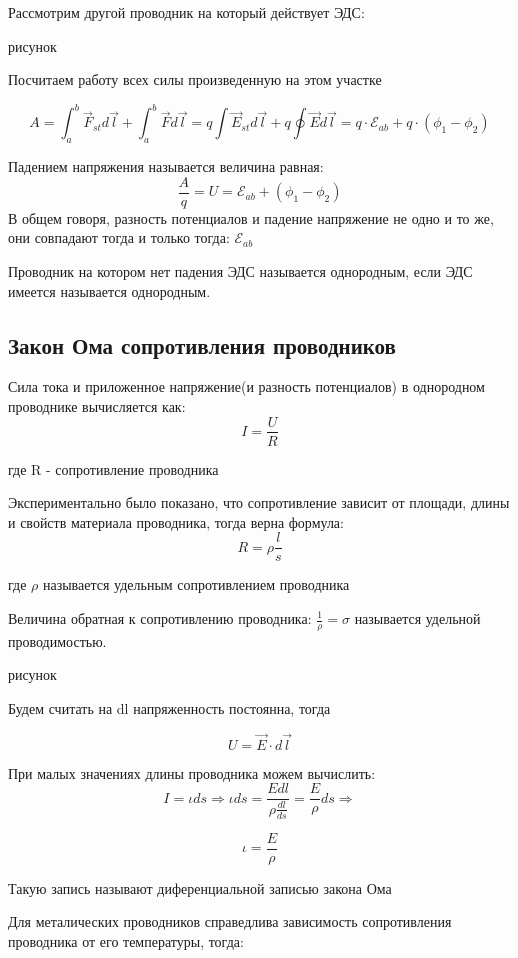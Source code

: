 \documentclass[../main.tex]{subfiles}
\begin{document}
Рассмотрим другой проводник на который действует ЭДС:

рисунок

Посчитаем работу всех силы произведенную на этом участке

\[A = \int_{a}^{b} \vec F_{st} d \vec l + \int_{a}^{b} \vec F d \vec l = q \int \vec E_{st} d \vec l + q \oint \vec E d \vec l = q \cdot \mathscr{E}_{ab} + q \cdot (\phi_1 - \phi_2)\]

 Падением напряжения называется величина равная:
\[\frac{A}{q} = U = \mathscr{E}_{ab} + (\phi_1 - \phi_2)\]
В общем говоря, разность потенциалов и падение напряжение не одно и то же, они совпадают тогда и только тогда: $\mathscr{E}_{ab}$ 

 Проводник на котором нет падения ЭДС называется однородным, если ЭДС имеется называется однородным.

\subsection{Закон Ома сопротивления проводников}

Сила тока и приложенное напряжение(и разность потенциалов) в однородном проводнике вычисляется как:
\[I = \frac{U}{R}\]
\begin{center}
    где R - сопротивление проводника
\end{center}


Экспериментально было показано, что сопротивление зависит от площади, длины и свойств материала проводника, тогда верна формула:
\[R = \rho \frac{l}{s}\]
\begin{center}
    где $\rho$  называется удельным сопротивлением проводника
\end{center}
 Величина обратная к сопротивлению проводника: $\frac{1}{\rho} = \sigma$ называется удельной проводимостью.

рисунок

Будем считать на dl напряженность постоянна, тогда

\[U = \vec E \cdot d \vec l\]

При малых значениях длины проводника можем вычислить:
\[I = \iota ds \Rightarrow \iota ds = \frac{E dl}{\rho \frac{dl}{ds}} =  \frac{E}{\rho} ds \Rightarrow\] 

\[\iota = \frac{E}{\rho}\]

 Такую запись называют диференциальной записью закона Ома

Для металических проводников справедлива  зависимость сопротивления проводника от его температуры, тогда:
\end{document}
